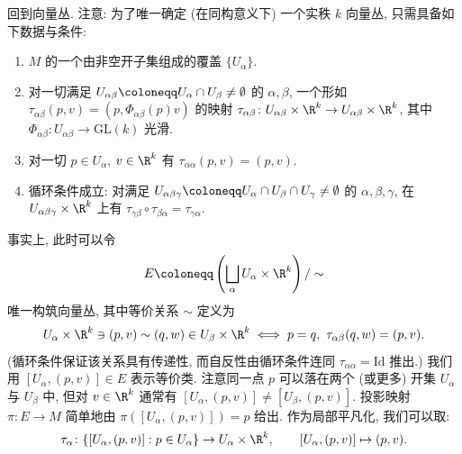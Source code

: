 回到向量丛. 注意: 为了唯一确定 (在同构意义下) 一个实秩 $k$ 向量丛, 只需具备如下数据与条件:
\begin{enumerate}
    \item $M$ 的一个由非空开子集组成的覆盖 $\{U_\alpha\}$.
    \item 对一切满足 $U_{\alpha\beta} \defeq U_\alpha \cap U_\beta \neq \emptyset$ 的 $\alpha, \beta$, 一个形如 $\tau_{\alpha\beta}(p, v) = (p, \Phi_{\alpha\beta}(p) v)$ 的映射 $\tau_{\alpha\beta} \colon U_{\alpha\beta} \times \R^k \to U_{\alpha\beta} \times \R^k$, 其中 $\Phi_{\alpha\beta} \colon U_{\alpha\beta} \to \mathrm{GL}(k)$ 光滑.
    \item 对一切 $p \in U_\alpha$, $v \in \R^k$ 有 $\tau_{\alpha\alpha}(p, v) = (p, v)$.
    \item 循环条件成立: 对满足 $U_{\alpha\beta\gamma} \defeq U_\alpha \cap U_\beta \cap U_\gamma \neq \emptyset$ 的 $\alpha, \beta, \gamma$, 在 $U_{\alpha\beta\gamma} \times \R^k$ 上有 $\tau_{\gamma\beta} \circ \tau_{\beta\alpha} = \tau_{\gamma\alpha}$.
\end{enumerate}
事实上, 此时可以令
\begin{equation}\label{eq:5.22}
    E \defeq \left( \bigsqcup_\alpha U_\alpha \times \R^k \right) / \sim
\end{equation}
唯一构筑向量丛, 其中等价关系 $\sim$ 定义为
\begin{equation}\label{eq:5.23}
    U_\alpha \times \R^k \ni (p, v) \sim (q, w) \in U_\beta \times \R^k \iff p = q, \ \tau_{\alpha\beta}(q, w) = (p, v).
\end{equation}
(循环条件保证该关系具有传递性, 而自反性由循环条件连同 $\tau_{\alpha\alpha} = \mathrm{Id}$ 推出.) 我们用 $[U_\alpha, (p, v)] \in E$ 表示等价类. 注意同一点 $p$ 可以落在两个 (或更多) 开集 $U_\alpha$ 与 $U_\beta$ 中, 但对 $v \in \R^k$ 通常有 $[U_\alpha, (p, v)] \neq [U_\beta, (p, v)]$. 投影映射 $\pi \colon E \to M$ 简单地由 $\pi([U_\alpha, (p, v)]) = p$ 给出. 作为局部平凡化, 我们可以取:
\begin{equation}\label{eq:5.24}
    \tau_\alpha \colon \{ [U_\alpha, (p, v)] : p \in U_\alpha \} \to U_\alpha \times \R^k, \qquad [U_\alpha, (p, v)] \mapsto (p, v).
\end{equation}


